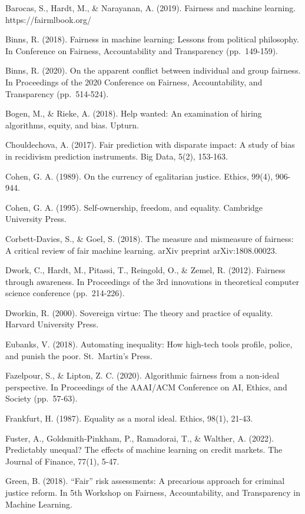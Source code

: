 Barocas, S., Hardt, M., \& Narayanan, A. (2019). Fairness and machine
learning. https://fairmlbook.org/

Binns, R. (2018). Fairness in machine learning: Lessons from political
philosophy. In Conference on Fairness, Accountability and Transparency
(pp.~149-159).

Binns, R. (2020). On the apparent conflict between individual and group
fairness. In Proceedings of the 2020 Conference on Fairness,
Accountability, and Transparency (pp.~514-524).

Bogen, M., \& Rieke, A. (2018). Help wanted: An examination of hiring
algorithms, equity, and bias. Upturn.

Chouldechova, A. (2017). Fair prediction with disparate impact: A study
of bias in recidivism prediction instruments. Big Data, 5(2), 153-163.

Cohen, G. A. (1989). On the currency of egalitarian justice. Ethics,
99(4), 906-944.

Cohen, G. A. (1995). Self-ownership, freedom, and equality. Cambridge
University Press.

Corbett-Davies, S., \& Goel, S. (2018). The measure and mismeasure of
fairness: A critical review of fair machine learning. arXiv preprint
arXiv:1808.00023.

Dwork, C., Hardt, M., Pitassi, T., Reingold, O., \& Zemel, R. (2012).
Fairness through awareness. In Proceedings of the 3rd innovations in
theoretical computer science conference (pp.~214-226).

Dworkin, R. (2000). Sovereign virtue: The theory and practice of
equality. Harvard University Press.

Eubanks, V. (2018). Automating inequality: How high-tech tools profile,
police, and punish the poor. St.~Martin's Press.

Fazelpour, S., \& Lipton, Z. C. (2020). Algorithmic fairness from a
non-ideal perspective. In Proceedings of the AAAI/ACM Conference on AI,
Ethics, and Society (pp.~57-63).

Frankfurt, H. (1987). Equality as a moral ideal. Ethics, 98(1), 21-43.

Fuster, A., Goldsmith-Pinkham, P., Ramadorai, T., \& Walther, A. (2022).
Predictably unequal? The effects of machine learning on credit markets.
The Journal of Finance, 77(1), 5-47.

Green, B. (2018). ``Fair'' risk assessments: A precarious approach for
criminal justice reform. In 5th Workshop on Fairness, Accountability,
and Transparency in Machine Learning.


